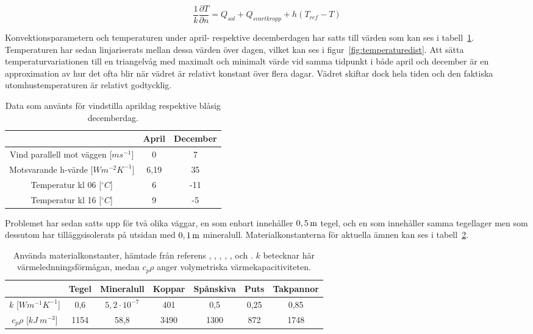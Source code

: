 \begin{equation}
\label{eq:wallneumann}
\frac{1}{k}\frac{\partial T}{\partial n} = Q_{sol} + Q_{svartkropp} + h(T_{ref}-T)
\end{equation}

Konvektionsparametern och temperaturen under april- respektive decemberdagen har satts till värden som kan ses i tabell~\ref{tbl:aprdec}. Temperaturen har sedan linjariserats mellan dessa värden över dagen, vilket kan ses i figur~\ref{fig:temperaturedist}. Att sätta temperaturvariationen till en triangelvåg med maximalt och minimalt värde vid samma tidpunkt i både april och december är en approximation av hur det ofta blir när vädret är relativt konstant över flera dagar. Vädret skiftar dock hela tiden och den faktiska utomhustemperaturen är relativt godtycklig.

\begin{table}[hpbt]
\centering
\caption{Data som använts för vindstilla aprildag respektive blåsig decemberdag.}
\begin{tabular}{c|c|c}
& April & December \\
\hline
Vind parallell mot väggen [$ms^{-1}$] & 0 & 7 \\
Motsvarande h-värde [$Wm^{-2}K^{-1}$] & 6,19 & 35 \\
Temperatur kl 06 [$^{\circ}C$] & 6 & -11 \\
Temperatur kl 16 [$^{\circ}C$] & 9 & -5
\end{tabular}
\label{tbl:aprdec}
\end{table}


Problemet har sedan satts upp för två olika väggar, en som enbart innehåller $\unit[0,5]{m}$ tegel, och en som innehåller samma tegellager men som dessutom har tilläggsisolerats på utsidan med $\unit[0,1]{m}$ mineralull. Materialkonstanterna för aktuella ämnen kan ses i tabell~\ref{tbl:materialconstants}.

\begin{table}[hpbt]
\centering
\caption{Använda materialkonstanter, hämtade från referens \cite{kandidatarbete2010}, \cite{engineeringtoolboxdensity}, \cite{bkvthermal}, \cite{engineeringtoolboxspecificheat}, \cite{engineeringcom}, \cite{engineeringtoolboxthermalconductivity} och \cite{ozel11}. $k$ betecknar här värmelednningsförmågan, medan $c_p\rho$ anger volymetriska värmekapacitiviteten.}
\begin{tabular}{c|c|c|c|c|c|c}
& Tegel & Mineralull & Koppar & Spånskiva & Puts & Takpannor \\
\hline
$k$ [$Wm^{-1}K^{-1}$] & 0,6 & $5,2\cdot 10^{-7}$ & 401 & 0,5 & 0,25 & 0,85\\
$c_p \rho$ [$kJ~m^{-3}$] & 1154 & 58,8 & 3490 & 1300 & 872 & 1748
\end{tabular}
\label{tbl:materialconstants}
\end{table}

